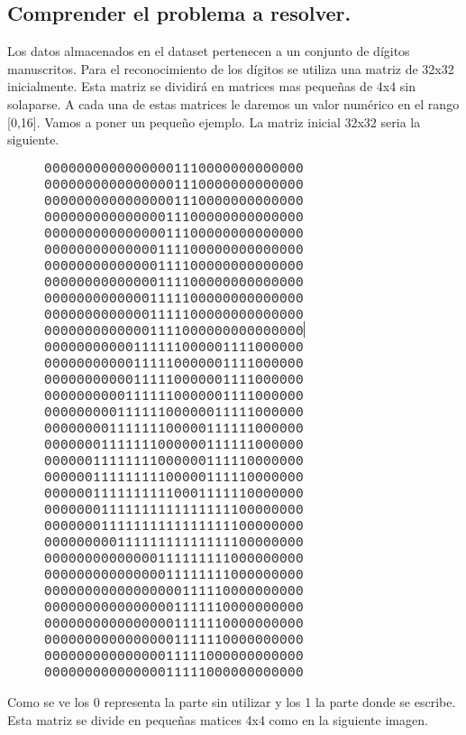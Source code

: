 \documentclass[titlepage]{article}
\begin{document}
	\subsection{Comprender el problema a resolver.}
	Los datos almacenados en el dataset pertenecen a un conjunto de dígitos manuscritos. 
	Para el reconocimiento de los dígitos se utiliza una matriz de 32x32 inicialmente. Esta matriz se dividirá en matrices mas pequeñas de 4x4 sin solaparse. A cada una de estas matrices le daremos un valor numérico en el rango [0,16].
	Vamos a poner un pequeño ejemplo. La matriz inicial 32x32 seria la siguiente.
\begin{figure}[H]
	\centering
	\includegraphics[width=0.7\linewidth, height=0.72\textheight]{4}

\end{figure}
	Como se ve los 0 representa la parte sin utilizar y los 1 la parte donde se escribe. 
	\newpage
	Esta matriz se divide en pequeñas matices 4x4 como en la siguiente imagen.
\end{document}
